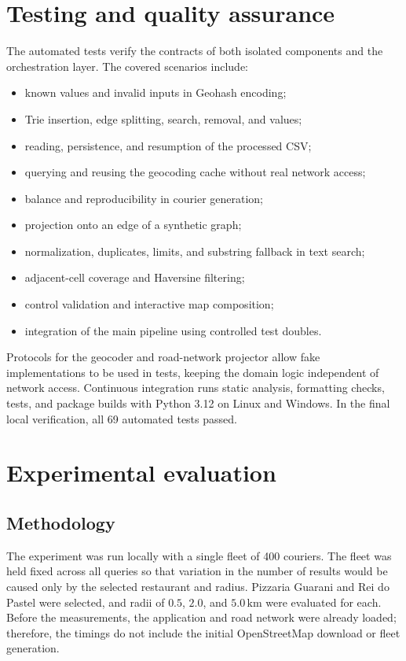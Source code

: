 \documentclass[12pt,a4paper]{article}
\begin{document}
\section{Testing and quality assurance}

The automated tests verify the contracts of both isolated components and the
orchestration layer. The covered scenarios include:

\begin{itemize}
    \item known values and invalid inputs in Geohash encoding;
    \item Trie insertion, edge splitting, search, removal, and values;
    \item reading, persistence, and resumption of the processed CSV;
    \item querying and reusing the geocoding cache without real network access;
    \item balance and reproducibility in courier generation;
    \item projection onto an edge of a synthetic graph;
    \item normalization, duplicates, limits, and substring fallback in text
    search;
    \item adjacent-cell coverage and Haversine filtering;
    \item control validation and interactive map composition;
    \item integration of the main pipeline using controlled test doubles.
\end{itemize}

Protocols for the geocoder and road-network projector allow fake
implementations to be used in tests, keeping the domain logic independent of
network access. Continuous integration runs static analysis, formatting checks,
tests, and package builds with Python 3.12 on Linux and Windows. In the final
local verification, all 69 automated tests passed.

\section{Experimental evaluation}

\subsection{Methodology}

The experiment was run locally with a single fleet of 400 couriers. The fleet
was held fixed across all queries so that variation in the number of results
would be caused only by the selected restaurant and radius. Pizzaria Guarani
and Rei do Pastel were selected, and radii of $0.5$, $2.0$, and
$5.0\,\mathrm{km}$ were evaluated for each. Before the measurements, the
application and road network were already loaded; therefore, the timings do not
include the initial OpenStreetMap download or fleet generation.
\end{document}

